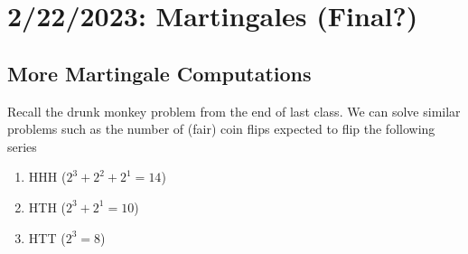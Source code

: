 \documentclass[12pt]{report}
\begin{document}
\chapter{2/22/2023: Martingales (Final?)}
\section{More Martingale Computations}
Recall the drunk monkey problem from the end of last class. We can solve similar problems such as the number of (fair) coin flips expected to flip the following series \begin{enumerate}
	\item HHH ($2^3+2^2+2^1=14$)
	\item HTH ($2^3+2^1=10$)
	\item HTT ($2^3=8$)
\end{enumerate}
\end{document}
